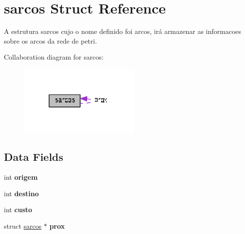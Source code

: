 \hypertarget{structsarcos}{\section{sarcos Struct Reference}
\label{structsarcos}
}



\begin{DoxyItemize}
\item A estrutura sarcos cujo o nome definido foi arcos, irá armazenar as informacoes sobre os arcos da rede de petri. 
\end{DoxyItemize} 




Collaboration diagram for sarcos\+:\nopagebreak
\begin{figure}[H]
\begin{center}
\leavevmode
\includegraphics[width=171pt]{structsarcos__coll__graph}
\end{center}
\end{figure}
\subsection*{Data Fields}
\begin{DoxyCompactItemize}
\item 
\hypertarget{structsarcos_a6fcf2f0844e9df8a952c5e320670a78a}{int {\bfseries origem}}\label{structsarcos_a6fcf2f0844e9df8a952c5e320670a78a}

\item 
\hypertarget{structsarcos_aa5d9030bfe6b99fa885afb9ca11a70c4}{int {\bfseries destino}}\label{structsarcos_aa5d9030bfe6b99fa885afb9ca11a70c4}

\item 
\hypertarget{structsarcos_a24fe72482be7db5e96af8eae5316bbb8}{int {\bfseries custo}}\label{structsarcos_a24fe72482be7db5e96af8eae5316bbb8}

\item 
\hypertarget{structsarcos_a9a1c21530791b8ac61f499a2d9b00da6}{struct \hyperlink{structsarcos}{sarcos} $\ast$ {\bfseries prox}}\label{structsarcos_a9a1c21530791b8ac61f499a2d9b00da6}

\end{DoxyCompactItemize}


